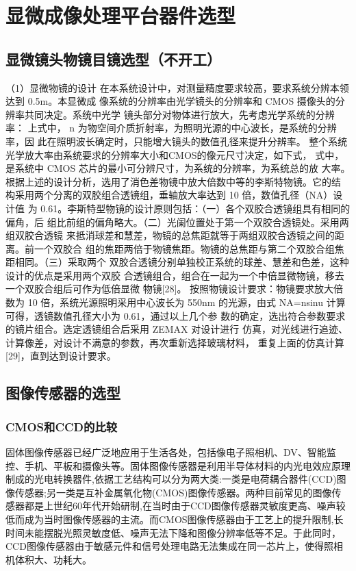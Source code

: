\section{显微成像处理平台器件选型}
\subsection{显微镜头物镜目镜选型（不开工）}
（1）显微物镜的设计 在本系统设计中，对测量精度要求较高，要求系统分辨本领达到 0.5m。本显微成 像系统的分辨率由光学镜头的分辨率和 CMOS 摄像头的分辨率共同决定。系统中光学 镜头部分对物体进行放大，先考虑光学系统的分辨率：
上式中， n 为物空间介质折射率，为照明光源的中心波长，是系统的分辨率，因 此在照明波长确定时，只能增大镜头的数值孔径来提升分辨率。 整个系统光学放大率由系统要求的分辨率大小和CMOS的像元尺寸决定，如下式，
式中，是系统中 CMOS 芯片的最小可分辨尺寸，为系统的分辨率，为系统总的放 大率。 根据上述的设计分析，选用了消色差物镜中放大倍数中等的李斯特物镜。它的结 构采用两个分离的双胶组合透镜组，垂轴放大率达到 10 倍，数值孔径（NA）设计值 为 0.61。李斯特型物镜的设计原则包括：（一）各个双胶合透镜组具有相同的偏角，后 组比前组的偏角略大。（二）光阑位置处于第一个双胶合透镜处。采用两组双胶合透镜 来抵消球差和慧差，物镜的总焦距就等于两组双胶合透镜之间的距离。前一个双胶合 组的焦距两倍于物镜焦距。物镜的总焦距与第二个双胶合组焦距相同。（三）采取两个 双胶合透镜分别单独校正系统的球差、慧差和色差，这种设计的优点是采用两个双胶 合透镜组合，组合在一起为一个中倍显微物镜，移去一个双胶合组后可作为低倍显微 物镜[28]。 按照物镜设计要求：物镜要求放大倍数为 10 倍，系统光源照明采用中心波长为 550nm 的光源，由式 NA=nsinu 计算可得，透镜数值孔径大小为 0.61，通过以上几个参 数的确定，选出符合参数要求的镜片组合。选定透镜组合后采用 ZEMAX 对设计进行 仿真，对光线进行追迹、计算像差，对设计不满意的参数，再次重新选择玻璃材料， 重复上面的仿真计算[29]，直到达到设计要求。
\subsection{图像传感器的选型}
\subsubsection{CMOS和CCD的比较}
固体图像传感器已经广泛地应用于生活各处，包括像电子照相机、DV、智能监控、手机、平板和摄像头等。固体图像传感器是利用半导体材料的内光电效应原理制成的光电转换器件,依据工艺结构可以分为两大类:一类是电荷耦合器件(CCD)图像传感器;另一类是互补金属氧化物(CMOS)图像传感器。两种目前常见的图像传感器都是上世纪60年代开始研制,在当时由于CCD图像传感器灵敏度更高、噪声较低而成为当时图像传感器的主流。而CMOS图像传感器由于工艺上的提升限制,长时间未能摆脱光照灵敏度低、噪声无法下降和图像分辨率低等不足。于此同时，CCD图像传感器由于敏感元件和信号处理电路无法集成在同一芯片上，使得照相机体积大、功耗大。\cite{CCDCMOSf}

